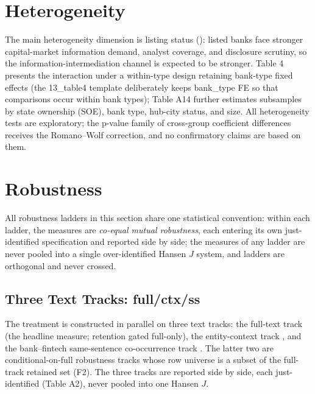 \section{Heterogeneity}\label{sec:het}
The main heterogeneity dimension is listing status
(): listed banks face stronger capital-market
information demand, analyst coverage, and disclosure scrutiny, so the
information-intermediation channel is expected to be stronger. Table 4
presents the  interaction under a within-type design
retaining bank-type fixed effects (the 13\_table4 template deliberately
keeps bank\_type FE so that comparisons occur within bank types);
Table A14 further estimates subsamples by state ownership (SOE), bank
type, hub-city status, and size. All heterogeneity tests are
exploratory; the p-value family of cross-group coefficient differences
receives the Romano--Wolf correction, and no confirmatory claims are
based on them.

\section{Robustness}\label{sec:robust}
All robustness ladders in this section share one statistical
convention: within each ladder, the measures are \emph{co-equal mutual
robustness}, each entering its own just-identified specification and
reported side by side; the measures of any ladder are never pooled into
a single over-identified Hansen $J$ system, and ladders are orthogonal
and never crossed.

\subsection{Three Text Tracks: full/ctx/ss}\label{sec:robust:tracks}
The treatment is constructed in parallel on three text tracks: the
full-text track  (the headline measure;
retention gated full-only), the entity-context track
, and the bank--fintech same-sentence
co-occurrence track . The latter two are
conditional-on-full robustness tracks whose row universe is a subset of
the full-track retained set (F2). The three tracks are reported side
by side, each just-identified (Table A2), never pooled into one Hansen
$J$. 

